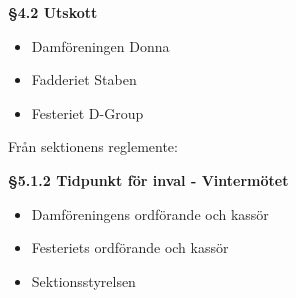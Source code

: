 \documentclass{datateknologsektionen-document}
\begin{document}
\textbf{§4.2 Utskott}
\begin{itemize}
  \item Damföreningen Donna
  \item Fadderiet Staben
  \item Festeriet D-Group
\end{itemize}

Från sektionens reglemente:

\textbf{§5.1.2 Tidpunkt för inval - Vintermötet}
\begin{itemize}
  \item Damföreningens ordförande och kassör
  \item Festeriets ordförande och kassör
  \item Sektionsstyrelsen
\end{itemize}
\end{document}
